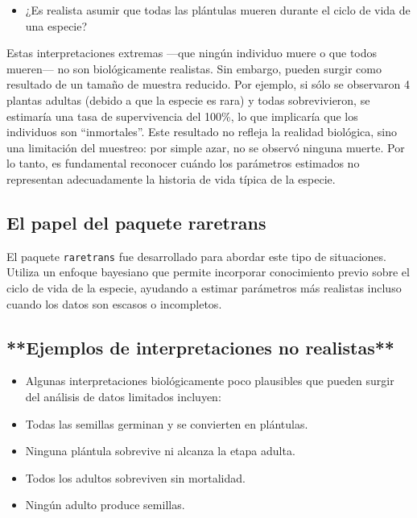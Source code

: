 \documentclass[
  12pt,
  letterpaper,
]{book}
\providecommand{\tightlist}{%
  \setlength{\itemsep}{0pt}\setlength{\parskip}{0pt}}\usepackage{longtable,booktabs,array}
\begin{document}
\begin{itemize}
\tightlist
\item
  ¿Es realista asumir que todas las plántulas mueren durante el ciclo de
  vida de una especie?
\end{itemize}

Estas interpretaciones extremas ---que ningún individuo muere o que
todos mueren--- no son biológicamente realistas. Sin embargo, pueden
surgir como resultado de un tamaño de muestra reducido. Por ejemplo, si
sólo se observaron 4 plantas adultas (debido a que la especie es rara) y
todas sobrevivieron, se estimaría una tasa de supervivencia del 100\%,
lo que implicaría que los individuos son ``inmortales''. Este resultado
no refleja la realidad biológica, sino una limitación del muestreo: por
simple azar, no se observó ninguna muerte. Por lo tanto, es fundamental
reconocer cuándo los parámetros estimados no representan adecuadamente
la historia de vida típica de la especie.

\subsection{El papel del paquete
raretrans}\label{el-papel-del-paquete-raretrans}

El paquete \texttt{raretrans} fue desarrollado para abordar este tipo de
situaciones. Utiliza un enfoque bayesiano que permite incorporar
conocimiento previo sobre el ciclo de vida de la especie, ayudando a
estimar parámetros más realistas incluso cuando los datos son escasos o
incompletos.

\subsection{**Ejemplos de interpretaciones no
realistas**}\label{ejemplos-de-interpretaciones-no-realistas}

\begin{itemize}
\item
  Algunas interpretaciones biológicamente poco plausibles que pueden
  surgir del análisis de datos limitados incluyen:
\item
  Todas las semillas germinan y se convierten en plántulas.
\item
  Ninguna plántula sobrevive ni alcanza la etapa adulta.
\item
  Todos los adultos sobreviven sin mortalidad.
\item
  Ningún adulto produce semillas.
\end{itemize}
\end{document}
